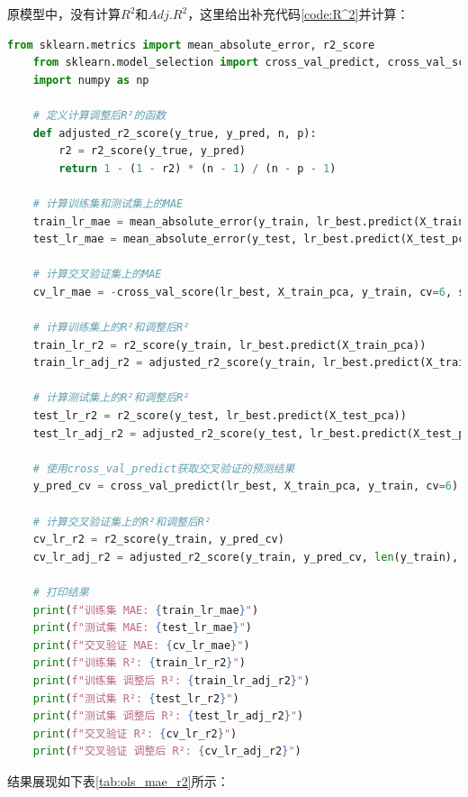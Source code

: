 \documentclass[
    report,     %
    oneside,    %
    UTF8,       %
    zihao=-4    %
]{config} %
\begin{document}
原模型中，没有计算$R^2$和$Adj. R^2$，这里给出补充代码\ref{code:R^2}并计算：
\begin{lstlisting}[label=code:R^2, language=Python, caption=OLS模型样本内外和交叉验证的MAE、$R^2$、$Adj. R^2$计算]
    from sklearn.metrics import mean_absolute_error, r2_score
    from sklearn.model_selection import cross_val_predict, cross_val_score
    import numpy as np

    # 定义计算调整后R²的函数
    def adjusted_r2_score(y_true, y_pred, n, p):
        r2 = r2_score(y_true, y_pred)
        return 1 - (1 - r2) * (n - 1) / (n - p - 1)

    # 计算训练集和测试集上的MAE
    train_lr_mae = mean_absolute_error(y_train, lr_best.predict(X_train_pca))
    test_lr_mae = mean_absolute_error(y_test, lr_best.predict(X_test_pca))

    # 计算交叉验证集上的MAE
    cv_lr_mae = -cross_val_score(lr_best, X_train_pca, y_train, cv=6, scoring='neg_mean_absolute_error').mean()

    # 计算训练集上的R²和调整后R²
    train_lr_r2 = r2_score(y_train, lr_best.predict(X_train_pca))
    train_lr_adj_r2 = adjusted_r2_score(y_train, lr_best.predict(X_train_pca), len(y_train), X_train_pca.shape[1])

    # 计算测试集上的R²和调整后R²
    test_lr_r2 = r2_score(y_test, lr_best.predict(X_test_pca))
    test_lr_adj_r2 = adjusted_r2_score(y_test, lr_best.predict(X_test_pca), len(y_test), X_test_pca.shape[1])

    # 使用cross_val_predict获取交叉验证的预测结果
    y_pred_cv = cross_val_predict(lr_best, X_train_pca, y_train, cv=6)

    # 计算交叉验证集上的R²和调整后R²
    cv_lr_r2 = r2_score(y_train, y_pred_cv)
    cv_lr_adj_r2 = adjusted_r2_score(y_train, y_pred_cv, len(y_train), X_train_pca.shape[1])

    # 打印结果
    print(f"训练集 MAE: {train_lr_mae}")
    print(f"测试集 MAE: {test_lr_mae}")
    print(f"交叉验证 MAE: {cv_lr_mae}")
    print(f"训练集 R²: {train_lr_r2}")
    print(f"训练集 调整后 R²: {train_lr_adj_r2}")
    print(f"测试集 R²: {test_lr_r2}")
    print(f"测试集 调整后 R²: {test_lr_adj_r2}")
    print(f"交叉验证 R²: {cv_lr_r2}")
    print(f"交叉验证 调整后 R²: {cv_lr_adj_r2}")
\end{lstlisting}

结果展现如下表\ref{tab:ols_mae_r2}所示：
\end{document}

